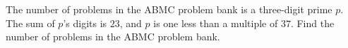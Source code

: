 The number of problems in the ABMC problem bank is a three-digit prime $p$. The sum of $p$'s digits is $23$, and $p$ is one less than a multiple of $37$. Find the number of problems in the ABMC problem bank.
